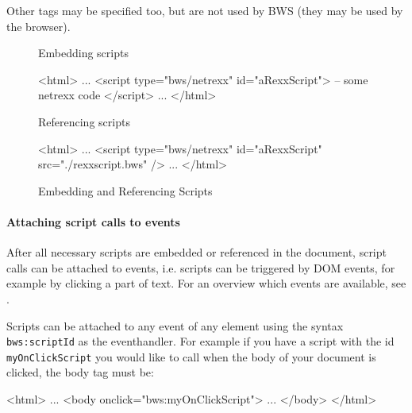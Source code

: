 
Other tags may be specified too, but are not used by BWS (they may be used by the browser).

\begin{figure}[htb]

	Embedding scripts

	\begin{verbatim*}
	<html>
	...
	<script type="bws/netrexx" id="aRexxScript">
	-- some netrexx code
	</script>
	...
	</html>
	\end{verbatim*}

	
	Referencing scripts
	

	\begin{verbatim*}
	<html>
	...
	<script type="bws/netrexx" id="aRexxScript" src="./rexxscript.bws" />
	...
	</html>
	\end{verbatim*}
	
	\label{fig:EmbeddingAndReferencingScripts}
	\caption{Embedding and Referencing Scripts}

\end{figure}

\paragraph{Attaching script calls to events}

After all necessary scripts are embedded or referenced in the document, script calls can be attached to events, i.e. scripts can be triggered by DOM events, for example by clicking a part of text. For an overview which events are available, see \cite{ReferenceDOMEvents}.

Scripts can be attached to any event of any element using the syntax \texttt{bws:scriptId} as the eventhandler. For example if you have a script with the id \texttt{myOnClickScript} you would like to call when the body of your document is clicked, the body tag must be:

\ttfamily

\begin{verbatim*}
<html>
...
<body onclick="bws:myOnClickScript">
...
</body>
</html>
\end{verbatim*}

